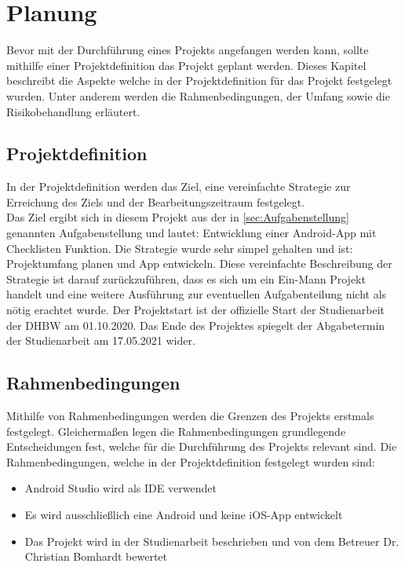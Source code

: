 \chapter{Planung} \label{chpt:planung}

Bevor mit der Durchführung eines Projekts angefangen werden kann, sollte mithilfe einer Projektdefinition das Projekt geplant werden. Dieses Kapitel beschreibt die Aspekte welche in der Projektdefinition für das Projekt festgelegt wurden. Unter anderem werden die Rahmenbedingungen, der Umfang sowie die Risikobehandlung erläutert.

\section{Projektdefinition}\label{sec:projektdef}
In der Projektdefinition werden das Ziel, eine vereinfachte Strategie zur Erreichung des Ziels und der Bearbeitungszeitraum festgelegt.\\
Das Ziel ergibt sich in  diesem Projekt aus der in \autoref{sec:Aufgabenstellung} genannten Aufgabenstellung und lautet: \glqq Entwicklung einer Android-App mit Checklisten Funktion\grqq.
Die Strategie wurde sehr simpel gehalten und ist: \glqq Projektumfang planen und App entwickeln\grqq. Diese vereinfachte Beschreibung der Strategie ist darauf zurückzuführen, dass es sich um ein Ein-Mann Projekt handelt und eine weitere Ausführung zur eventuellen Aufgabenteilung nicht als nötig erachtet wurde.
Der Projektstart ist der offizielle Start der Studienarbeit der \ac{DHBW} am 01.10.2020. Das Ende des Projektes spiegelt der Abgabetermin der Studienarbeit am 17.05.2021 wider.

\section{Rahmenbedingungen}\label{sec:rehamen}
Mithilfe von Rahmenbedingungen werden die Grenzen des Projekts erstmals festgelegt. Gleichermaßen legen die Rahmenbedingungen grundlegende Entscheidungen fest, welche für die Durchführung des Projekts relevant sind. Die Rahmenbedingungen, welche in der Projektdefinition festgelegt wurden sind:

\begin{itemize}
	\item Android Studio wird als \ac{IDE} verwendet
	\item Es wird ausschließlich eine Android und keine iOS-App entwickelt
	\item Das Projekt wird in der Studienarbeit beschrieben und von dem Betreuer Dr. Christian Bomhardt bewertet
\end{itemize}

